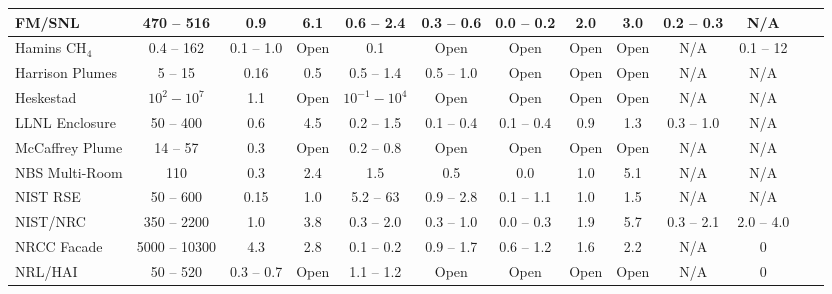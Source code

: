 \begin{table}
\begin{center}
\begin{tabular}{|l|c|c|c|c|c|c|c|c|c|c|c|c|}
FM/SNL              & 470 -- 516    & 0.9           & 6.1   & 0.6 -- 2.4        & 0.3 -- 0.6          & 0.0 -- 0.2    & 2.0         & 3.0         & 0.2 -- 0.3            & N/A                   \\ \hline
Hamins CH$_4$       & 0.4 -- 162    & 0.1 -- 1.0    & Open  & 0.1               & Open                & Open          & Open        & Open        & N/A                   & 0.1 -- 12             \\ \hline
Harrison Plumes     & 5 -- 15       & 0.16          & 0.5   & 0.5 -- 1.4        & 0.5 -- 1.0          & Open          & Open        & Open        & N/A                   & N/A                   \\ \hline
Heskestad           & $10^2-10^7$   & 1.1           & Open  & $10^{-1}-10^4$    & Open                & Open          & Open        & Open        & N/A                   & N/A                   \\ \hline
LLNL Enclosure      & 50 -- 400     & 0.6           & 4.5   & 0.2 -- 1.5        & 0.1 -- 0.4          & 0.1 -- 0.4    & 0.9         & 1.3         & 0.3 -- 1.0            & N/A                   \\ \hline
McCaffrey Plume     & 14 -- 57      & 0.3           & Open  & 0.2 -- 0.8        & Open                & Open          & Open        & Open        & N/A                   & N/A                   \\ \hline
NBS Multi-Room      & 110           & 0.3           & 2.4   & 1.5               & 0.5                 & 0.0           & 1.0         & 5.1         & N/A                   & N/A                   \\ \hline
NIST RSE            & 50 -- 600     & 0.15          & 1.0   & 5.2 -- 63         & 0.9 -- 2.8          & 0.1 -- 1.1    & 1.0         & 1.5         & N/A                   & N/A                   \\ \hline
NIST/NRC            & 350 -- 2200   & 1.0           & 3.8   & 0.3 -- 2.0        & 0.3 -- 1.0          & 0.0 -- 0.3    & 1.9         & 5.7         & 0.3 -- 2.1            & 2.0 -- 4.0            \\ \hline
NRCC Facade         & 5000 -- 10300 & 4.3           & 2.8   & 0.1 -- 0.2        & 0.9 -- 1.7          & 0.6 -- 1.2    & 1.6         & 2.2         & N/A                   & 0                     \\ \hline
NRL/HAI             & 50 -- 520     & 0.3 -- 0.7    & Open  & 1.1 -- 1.2        & Open                & Open          & Open        & Open        & N/A                   & 0                     \\ \hline

\end{tabular}
\end{center}
\end{table}
